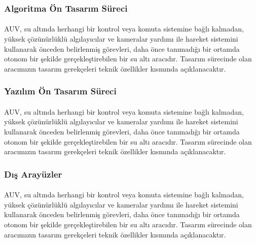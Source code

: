 \documentclass[12pt]{article}
\begin{document}
\subsubsection{Algoritma Ön Tasarım Süreci}

\begin{justify}
\paragraph{} AUV, su altında herhangi bir kontrol veya komuta sistemine bağlı kalmadan, yüksek çözünürlüklü algılayıcılar ve kameralar yardımı ile hareket sistemini kullanarak önceden belirlenmiş görevleri, daha önce tanımadığı bir ortamda otonom bir şekilde gerçekleştirebilen bir su altı aracıdır. Tasarım sürecinde olan aracımızın tasarım gerekçeleri teknik özellikler kısmında açıklanacaktır.
\end{justify}

\subsubsection{Yazılım Ön Tasarım Süreci}

\begin{justify}
\paragraph{} AUV, su altında herhangi bir kontrol veya komuta sistemine bağlı kalmadan, yüksek çözünürlüklü algılayıcılar ve kameralar yardımı ile hareket sistemini kullanarak önceden belirlenmiş görevleri, daha önce tanımadığı bir ortamda otonom bir şekilde gerçekleştirebilen bir su altı aracıdır. Tasarım sürecinde olan aracımızın tasarım gerekçeleri teknik özellikler kısmında açıklanacaktır.
\end{justify}

\subsubsection{Dış Arayüzler}

\begin{justify}
\paragraph{} AUV, su altında herhangi bir kontrol veya komuta sistemine bağlı kalmadan, yüksek çözünürlüklü algılayıcılar ve kameralar yardımı ile hareket sistemini kullanarak önceden belirlenmiş görevleri, daha önce tanımadığı bir ortamda otonom bir şekilde gerçekleştirebilen bir su altı aracıdır. Tasarım sürecinde olan aracımızın tasarım gerekçeleri teknik özellikler kısmında açıklanacaktır.
\end{justify}
\end{document}
